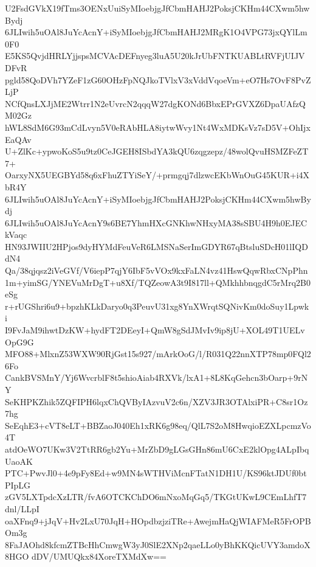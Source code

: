 U2FsdGVkX19fTms3OENxUuiSyMIoebjgJfCbmHAHJ2PoksjCKHm44CXwm5hwBydj
6JLIwih5uOAl8JuYcAcnY+iSyMIoebjgJfCbmHAHJ2MRgK1O4VPG73jxQYlLm0F0
E5KS5QvjdHRLYjjspsMCVAcDEFnyeg3luA5U20kJrUbFNTKUABLtRVFjUIJVDFvR
pgld58QoDVh7YZeF1zG60OHzFpNQJkoTVlxV3xVddVqoeVm+eO7Hs7OvF8PvZLjP
NCfQnsLXJjME2Wtrr1N2eUvrcN2qqqW27dgKONd6BbxEPrGVXZ6DpaUAfzQM02Gz
hWL8SdM6G93mCdLvyn5V0eRAbHLA8iytwWvy1Nt4WxMDKsVz7sD5V+OhIjxEaQAv
U+ZlKc+ypwoKoS5u9tz0CeJGEH8ISbdYA3kQU6zqgzepz/48wolQvuHSMZFeZT7+
OarxyNX5UEGBYd58q6xFhuZTYiSeY/+prmgqj7dlzwcEKbWnOuG45KUR+i4XbR4Y
6JLIwih5uOAl8JuYcAcnY+iSyMIoebjgJfCbmHAHJ2PoksjCKHm44CXwm5hwBydj
6JLIwih5uOAl8JuYcAcnY9s6BE7YhmHXcGNKhwNHxyMA38sSBU4H9h0EJECkVaqc
HN93JWIIU2HPjos9dyHYMdFeuVeR6LMSNaSerImGDYR67qBtsluSDcH01lIQDdN4
Qa/38qjqsz2iVeGVf/V6iepP7qjY6IbF5vVOx9kxFaLN4vz41HswQqwRbxCNpPhn
1m+yimSG/YNEVuMrDgT+u8Xf/TQZeowA3t9I817ll+QMkhhbnqgdC5rMrq2B0eSg
r+rUGShri6u9+bpzhKLkDaryo0q3PeuvU31xg8YnXWrqtSQNivKm0doSuy1Lpwki
I9FvJaM9ihwtDzKW+hydFT2DEeyI+QmW8gSdJMvIv9ip8jU+XOL49T1UELvOpG9G
MFO88+MlxnZ53WXW90RjGst15s927/mArkOoG/l/R031Q22nnXTP78mp0FQl26Fo
CankBVSMnY/Yj6WvcrblF8t5shioAiab4RXVk/lxA1+8L8KqGehcn3bOarp+9rNY
SeKHPKZhik5ZQFIPH6lqxChQVByIAzvuV2c6n/XZV3JR3OTAlxiPR+C8sr1Oz7hg
SeEqhE3+cVT8eLT+BBZaoJ040Eh1xRK6g98eq/QlL7S2oM8HwqioEZXLpcmzVo4T
atdOeWO7UKw3V2TtRR6gb2Yu+MrZbD9gLGsGHn86mU6CxE2klOpg4ALpIbqUaoAK
PTC+PwvJl0+4e9pFy8Ed+w9MN4sWTHViMcnFTatN1DH1U/KS96ktJDUf0btPIpLG
zGV5LXTpdcXzLTR/fvA6OTCKChDO6mNxoMqGq5/TKGtUKwL9CEmLhfT7dnl/LLpI
oaXFnq9+jJqV+Hv2LxU70JqH+HOpdbzjziTRe+AwejmHaQjWIAFMeR5FrOPBOm3g
8FaJAOhd8kfcmZTBcHhCmwgW3yJ0SlE2XNp2qaeLLo0yBhKKQicUVY3amdoX8HGO
dDV/UMUQkx84XoreTXMdXw==
